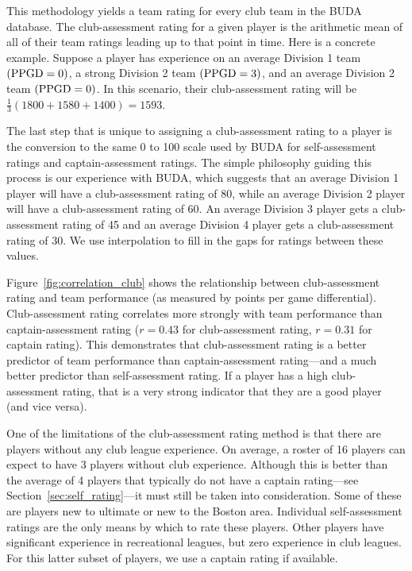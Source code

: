 This methodology yields a team rating for every club team in the BUDA database. The club-assessment rating for a given player is the arithmetic mean of all of their team ratings leading up to that point in time. Here is a concrete example. Suppose a player has experience on an average Division 1 team $({\rm PPGD} = 0)$, a strong Division 2 team $({\rm PPGD} = 3)$, and an average Division 2 team $({\rm PPGD} = 0)$. In this scenario, their club-assessment rating will be $\frac{1}{3}(1800 + 1580 + 1400) = 1593$.

The last step that is unique to assigning a club-assessment rating to a player is the conversion to the same 0 to 100 scale used by BUDA for self-assessment ratings and captain-assessment ratings. The simple philosophy guiding this process is our experience with BUDA, which suggests that an average Division 1 player will have a club-assessment rating of 80, while an average Division 2 player will have a club-assessment rating of 60. An average Division 3 player gets a club-assessment rating of 45 and an average Division 4 player gets a club-assessment rating of 30. We use interpolation to fill in the gaps for ratings between these values.

Figure~\ref{fig:correlation_club} shows the relationship between club-assessment rating and team performance (as measured by points per game differential). Club-assessment rating correlates more strongly with team performance than captain-assessment rating ($r = 0.43$ for club-assessment rating, $r = 0.31$ for captain rating). This demonstrates that club-assessment rating is a better predictor of team performance than captain-assessment rating---and a much better predictor than self-assessment rating. If a player has a high club-assessment rating, that is a very strong indicator that they are a good player (and vice versa).

One of the limitations of the club-assessment rating method is that there are players without any club league experience.  On average, a roster of 16 players can expect to have 3 players without club experience. Although this is better than the average of 4 players that typically do not have a captain rating---see Section~\ref{sec:self_rating}---it must still be taken into consideration. Some of these are players new to ultimate or new to the Boston area. Individual self-assessment ratings are the only means by which to rate these players. Other players have significant experience in recreational leagues, but zero experience in club leagues. For this latter subset of players, we use a captain rating if available. 

